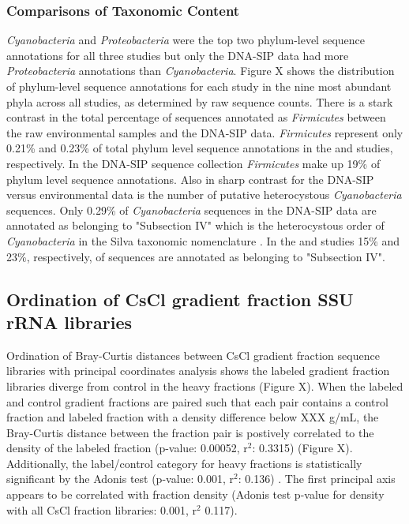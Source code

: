 \subsubsection{Comparisons of Taxonomic Content} 
\textit{Cyanobacteria} and \textit{Proteobacteria} were the top two phylum-level sequence annotations for all three studies but only the DNA-SIP data had more \textit{Proteobacteria} annotations than \textit{Cyanobacteria}. Figure X shows the distribution of phylum-level sequence annotations for each study in the nine most abundant  phyla across all studies, as determined by raw sequence counts. There is a stark contrast in the total percentage of sequences annotated as \textit{Firmicutes} between the raw environmental samples and the DNA-SIP data. \textit{Firmicutes} represent only 0.21\% and 0.23\% of total phylum level sequence annotations in the \citet{Steven_2013} and \citet{Garcia_Pichel_2013} studies, respectively. In the DNA-SIP sequence collection \textit{Firmicutes} make up 19\% of phylum level sequence annotations. Also in sharp contrast for the DNA-SIP versus environmental data is the number of putative heterocystous \textit{Cyanobacteria} sequences. Only 0.29\% of \textit{Cyanobacteria} sequences in the DNA-SIP data are annotated as belonging to "Subsection IV" which is the heterocystous order of \textit{Cyanobacteria} in the Silva taxonomic nomenclature \cite{17947321}. In the \citet{Steven_2013} and \citet{Garcia_Pichel_2013} studies 15\% and 23\%, respectively, of  sequences are annotated as belonging to "Subsection IV".  

\subsection{Ordination of CsCl gradient fraction SSU rRNA libraries}
Ordination of Bray-Curtis \cite{Bray_1957} distances between CsCl gradient fraction sequence libraries with principal coordinates analysis shows the labeled gradient fraction libraries diverge from control in the heavy fractions (Figure X). When the labeled and control gradient fractions are paired such that each pair contains a control fraction and labeled fraction with a density difference below XXX g/mL, the Bray-Curtis distance between the fraction pair is postively correlated to the density of the labeled fraction (p-value: 0.00052, r$^{2}$: 0.3315) (Figure X). Additionally, the label/control category for heavy fractions is statistically significant by the Adonis test (p-value: 0.001, r$^{2}$: 0.136) \cite{Anderson_2001}. The first principal axis appears to be correlated with fraction density (Adonis test p-value for density with all CsCl fraction libraries: 0.001, r$^{2}$ 0.117).

